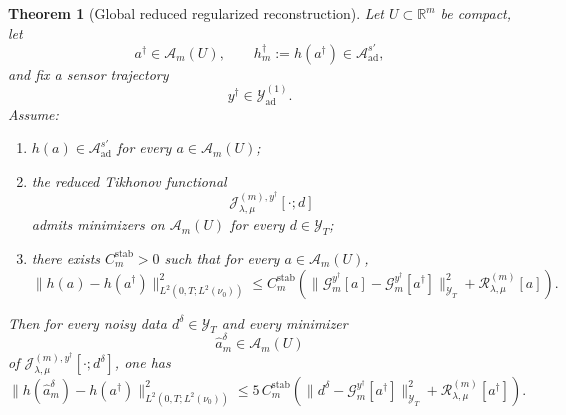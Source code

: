 \documentclass{article}
\newtheorem{theorem}{Theorem}[section]
\theoremstyle{definition}
\begin{document}
\begin{theorem}[Global reduced regularized reconstruction]
    \label{thm:local-reduced-reconstruction}
    Let \(U\subset\mathbb R^m\) be compact, let
    \[
        a^\dagger\in \mathcal A_m(U),
        \qquad
        h_m^\dagger:=h(a^\dagger)\in \mathcal A_{\mathrm{ad}}^{s'},
    \]
    and fix a sensor trajectory
    \[
        y^\dagger\in \mathcal Y_{\mathrm{ad}}^{(1)}.
    \]
    Assume:
    \begin{enumerate}
        \item \(h(a)\in \mathcal A_{\mathrm{ad}}^{s'}\) for every \(a\in \mathcal A_m(U)\);
        \item the reduced Tikhonov functional
              \[
                  \mathcal J_{\lambda,\mu}^{(m),y^\dagger}[\cdot;d]
              \]
              admits minimizers on \(\mathcal A_m(U)\) for every \(d\in \mathcal Y_T\);
        \item there exists \(C_m^{\mathrm{stab}}>0\) such that for every \(a\in \mathcal A_m(U)\),
              \begin{equation}
                  \label{eq:global-reduced-stability}
                  \|h(a)-h(a^\dagger)\|_{L^2(0,T;L^2(\nu_0))}^2
                  \le
                  C_m^{\mathrm{stab}}
                  \left(
                  \|\mathcal G_m^{y^\dagger}[a]-\mathcal G_m^{y^\dagger}[a^\dagger]\|_{\mathcal Y_T}^2
                  +
                  \mathcal R_{\lambda,\mu}^{(m)}[a]
                  \right).
              \end{equation}
    \end{enumerate}

    Then for every noisy data \(d^\delta\in \mathcal Y_T\) and every minimizer
    \[
        \hat a_m^\delta\in \mathcal A_m(U)
    \]
    of \(\mathcal J_{\lambda,\mu}^{(m),y^\dagger}[\cdot;d^\delta]\), one has
    \begin{equation}
        \label{eq:global-reduced-regularized-estimate}
        \|h(\hat a_m^\delta)-h(a^\dagger)\|_{L^2(0,T;L^2(\nu_0))}^2
        \le
        5\,C_m^{\mathrm{stab}}
        \left(
        \|d^\delta-\mathcal G_m^{y^\dagger}[a^\dagger]\|_{\mathcal Y_T}^2
        +
        \mathcal R_{\lambda,\mu}^{(m)}[a^\dagger]
        \right).
    \end{equation}
\end{theorem}
\end{document}
